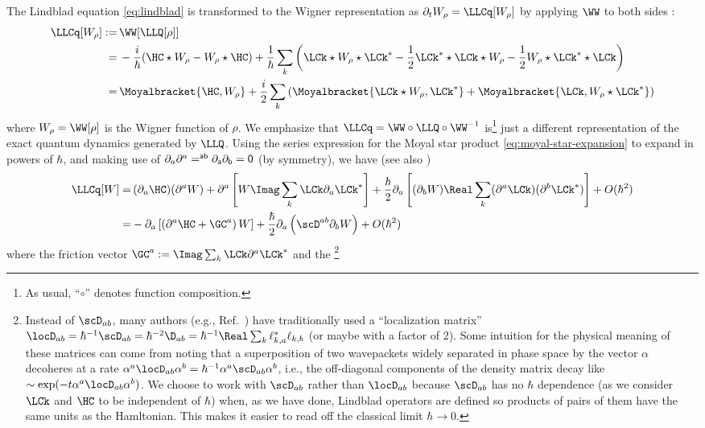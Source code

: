 \documentclass{article}
\numberwithin{equation}{section}
\begin{document}
The Lindblad equation \eqref{eq:lindblad} is
transformed to the Wigner representation as $\partial_t W_\rho = \LLCq[W_\rho]$ by applying $\WW$ to both sides \cite{graefe2018lindblad, strunz1998classical, tzanakis1998generalized}:
\begin{align}
    \LLCq [W_\rho] :=&\, \WW[\LLQ[\rho]] \\ 
    =&\, -\frac{i}{\hbar} (\HC \star W_\rho - W_\rho \star \HC)  + \frac{1}{\hbar }\sum_k \left( \LCk  \star W_\rho \star \LCk^* - \frac{1}{2} \LCk^* \star \LCk \star W_\rho - \frac{1}{2} W_\rho\star \LCk^* \star \LCk   \right)\\
    =&\, \Moyalbracket{\HC,W_\rho} + \frac{i}{2}\sum_k \left( \Moyalbracket{\LCk  \star W_\rho, \LCk^*} + \Moyalbracket{\LCk, W_\rho \star \LCk^*} \right) 
\end{align}
where $W_\rho=\WW[\rho]$ is the Wigner function of $\rho$. 
We emphasize that $\LLCq  = \WW\circ\LLQ\circ\WW^{-1}$ is\footnote{As usual, ``$\circ$'' denotes function composition.} just a different representation of the exact quantum dynamics generated by $\LLQ$.
Using the series expression for the Moyal star product \eqref{eq:moyal-star-expansion} to expand in powers of $\hbar$, and making use of $\partial_a \partial^a = \sf^{ab} \partial_a \partial_b = 0$ (by symmetry), we have \cite{frigerio1984diffusion,tzanakis1998generalized,strunz1998classical,dubois2021semiclassical} (see also \cite{heller1976wigner, pule1979classical, brodier2004symplectic,bondar2016wigner})
\begin{align}
    \label{eq:quantum-fokker-planck-unsimplified}
    \LLCq [W] =&\, 
        (\partial_a \HC) (\partial^a W )+  \partial^a \left[W  \Imag \sum_k \LCk \partial_a \LCk^*\right] +\frac{\hbar}{2} \partial_a \left[(\partial_b W) \Real  \sum_k(\partial^a \LCk)(\partial^b \LCk^*)\right] + O(\hbar^2)\\
    \label{eq:quantum-fokker-planck}
     =& -\partial_a \left[\left(\partial^a \HC +   \GC^a\right) W\right]  +	\frac{\hbar}{2} \partial_a \left(\scD^{ab} \partial_b W\right) + O(\hbar^2)
\end{align}
where 
the friction vector $\GC^a:=\Imag \sum_k \LCk \partial^a \LCk^*$ and the \footnote{Instead of $\scD_{ab}$, many authors (e.g., Ref.~\cite{joos2013decoherence}) have traditionally used a ``localization matrix'' $\locD_{ab} = \hbar^{-1}\scD_{ab} = \hbar^{-2}\D_{ab} = \hbar^{-1} \Real \sum_k \ell_{k,a}^* \ell_{k,b}$ (or maybe with a factor of 2).  Some intuition for the physical meaning of these matrices can come from noting that a superposition of two wavepackets widely separated in phase space by the vector $\alpha$ decoheres at a rate $\alpha^a \locD_{ab} \alpha^b = \hbar^{-1} \alpha^a \scD_{ab} \alpha^b$, i.e., the off-diagonal components of the density matrix decay like $\sim \exp(-t \alpha^a \locD_{ab} \alpha^b)$. We choose to work with $\scD_{ab}$ rather than $\locD_{ab}$ because $\scD_{ab}$ has no $\hbar$ dependence (as we consider $\LCk$ and $\HC$ to be independent of $\hbar$) when, as we have done, Lindblad operators are defined so products of pairs of them have the same units as the Hamltonian. This makes it easier to read off the classical limit $\hbar\to 0$.}
\end{document}

